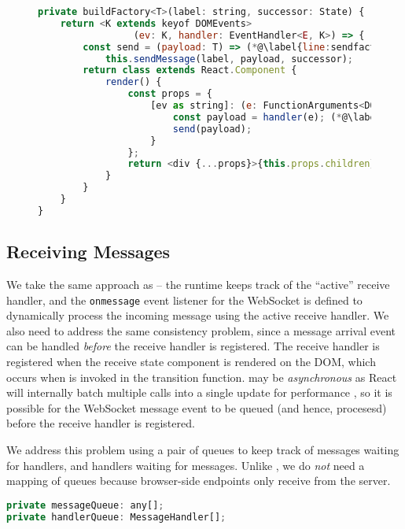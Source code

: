 \begin{figure}[!h]
\begin{lstlisting}[language=javascript,tabsize=2]
private buildFactory<T>(label: string, successor: State) { (*@\label{line:sendfactoryparams}@*)
	return <K extends keyof DOMEvents>
				 (ev: K, handler: EventHandler<E, K>) => {
		const send = (payload: T) => (*@\label{line:sendfactorycurrysend}@*)
			this.sendMessage(label, payload, successor);
		return class extends React.Component {
			render() {
				const props = {
					[ev as string]: (e: FunctionArguments<DOMEvents[K]>) => {
						const payload = handler(e); (*@\label{line:sendfactoryhandler}@*)
						send(payload);
					}
				};
				return <div {...props}>{this.props.children}</div> (*@\label{line:sendfactorydiv}@*)
			}		
		}	
	}
}
\end{lstlisting}
\label{lst:reactsendfactory}
\end{figure}

\subsection{Receiving Messages}
\label{subsection:reactruntimereceive}

We take the same approach as  --
the runtime keeps track of the ``active'' receive handler,
and the \texttt{onmessage} event listener for the WebSocket
is defined to dynamically process the incoming message
using the active receive handler.
We also need to address the same consistency problem, since
a message arrival event can be handled \textit{before}
the receive handler is registered.
The receive handler is registered when the receive state component
is rendered on the DOM, which occurs when 
is invoked in the transition function.
 may be \textit{asynchronous}
as React will internally batch multiple calls into a single update
for performance \cite{ReactState}, so it is possible for the WebSocket message
event to be queued (and hence, procesesd) before the receive handler
is registered.

We address this problem using a pair of queues to keep track
of messages waiting for handlers, and handlers waiting for messages.
Unlike , we do \textit{not} need a mapping
of queues because browser-side endpoints only receive from the server.

\begin{lstlisting}[language=javascript,numbers=none]
private messageQueue: any[];
private handlerQueue: MessageHandler[];
\end{lstlisting}

